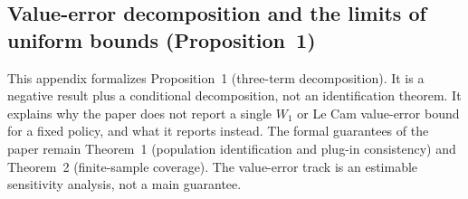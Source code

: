 %
%

\allowdisplaybreaks

\providecommand{\TV}{\mathrm{TV}}

\newtheorem*{aIIPropMain}{Proposition 1}
\newtheorem*{aIIPropTV}{Proposition A.1}
\newtheorem*{aIILemOneStep}{Lemma A.2}
\newtheorem*{aIICorMixed}{Corollary A.3}
\newtheorem*{aIIDefLeCam}{Definition A.4}
\newtheorem*{aIILemLeCam}{Lemma A.5}
\newtheorem*{aIIPropLeCam}{Proposition A.6}
\newtheorem*{aIIPropWone}{Proposition A.7}
\newtheorem*{aIIPropBoundary}{Proposition A.8}

\providecommand{\theHequation}{}
\let\aIItheHequation\theHequation
{}
\renewcommand{\theHequation}{aII.\arabic{aIIKanchor}}
\newcommand{\aIIfixedtag}[1]{\stepcounter{aIIKanchor}\tag{#1}}

\subsection{Value-error decomposition and the limits of uniform bounds (Proposition~1)}\label{app:a2}

This appendix formalizes Proposition~1 (three-term decomposition).  It is a negative result plus a
conditional decomposition, not an identification theorem.  It explains why the
paper does not report a single $W_1$ or Le Cam value-error bound for a fixed
policy, and what it reports instead.  The formal guarantees of the paper remain
Theorem~1 (population identification and plug-in consistency) and Theorem~2
(finite-sample coverage).  The value-error track is an estimable sensitivity
analysis, not a main guarantee.

